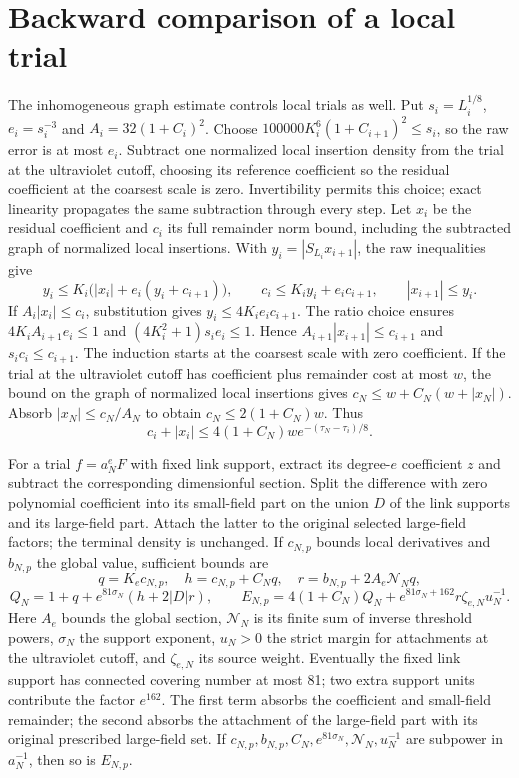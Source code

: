 \section{Backward comparison of a local trial}
\label{ch11:trial-descent}
The inhomogeneous graph estimate controls local trials as well.
Put $s_i=L_i^{1/8}$, $e_i=s_i^{-3}$ and $A_i=32(1+C_i)^2$.
Choose $100000K_i^6(1+C_{i+1})^2\le s_i$, so the raw error is
at most $e_i$. Subtract one normalized local insertion density from the trial at the ultraviolet cutoff,
choosing its reference coefficient so the residual coefficient at the coarsest scale
is zero. Invertibility permits this choice; exact linearity propagates
the same subtraction through every step.
Let $x_i$ be the residual coefficient and $c_i$ its full remainder norm bound, including the subtracted graph of normalized local insertions. With
$y_i=|S_{L_i}x_{i+1}|$, the raw inequalities give
\[
 y_i\le K_i\bigl(|x_i|+e_i(y_i+c_{i+1})\bigr),\qquad
 c_i\le K_iy_i+e_ic_{i+1},\qquad |x_{i+1}|\le y_i.
\]
If $A_i|x_i|\le c_i$, substitution gives
$y_i\le4K_ie_ic_{i+1}$. The ratio choice ensures
$4K_iA_{i+1}e_i\le1$ and $(4K_i^2+1)s_ie_i\le1$.
Hence $A_{i+1}|x_{i+1}|\le c_{i+1}$ and $s_ic_i\le c_{i+1}$.
The induction starts at the coarsest scale with zero coefficient.
If the trial at the ultraviolet cutoff has coefficient plus remainder cost at most $w$,
the bound on the graph of normalized local insertions gives $c_N\le w+C_N(w+|x_N|)$.
Absorb $|x_N|\le c_N/A_N$ to obtain $c_N\le2(1+C_N)w$.
Thus
\begin{equation}
 c_i+|x_i|\le4(1+C_N)w e^{-(\tau_N-\tau_i)/8}.
 \label{ch11:descent-error}
\end{equation}

For a trial $f=a_N^eF$ with fixed link support, extract its degree-$e$
coefficient $z$ and subtract the corresponding dimensionful section.
Split the difference with zero polynomial coefficient into its small-field part on the
union $D$ of the link supports and its large-field part. Attach the latter to
the original selected large-field factors; the terminal density is
unchanged. If $c_{N,p}$ bounds local derivatives and $b_{N,p}$
the global value, sufficient bounds are
\[
 q=K_ec_{N,p},\quad h=c_{N,p}+C_Nq,\quad
 r=b_{N,p}+2A_e\mathcal N_Nq,
\]
\[
 Q_N=1+q+e^{81\sigma_N}(h+2|D|r),\qquad
 E_{N,p}=4(1+C_N)Q_N+
       e^{81\sigma_N+162}r\zeta_{e,N}u_N^{-1}.
\]
Here $A_e$ bounds the global section, $\mathcal N_N$ is its finite
sum of inverse threshold powers, $\sigma_N$ the support exponent,
$u_N>0$ the strict margin for attachments at the ultraviolet cutoff, and $\zeta_{e,N}$ its
source weight. Eventually the fixed link support has connected covering number at most 81;
two extra support units contribute the factor $e^{162}$.
The first term absorbs the coefficient and small-field remainder; the
second absorbs the attachment of the large-field part with its original prescribed large-field set.
If $c_{N,p},b_{N,p},C_N,e^{81\sigma_N},\mathcal N_N,u_N^{-1}$
are subpower in $a_N^{-1}$, then so is $E_{N,p}$.


